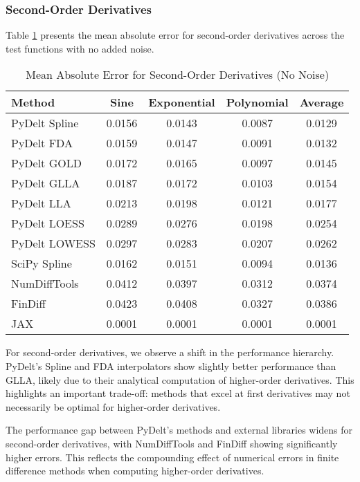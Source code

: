 \documentclass[11pt,a4paper]{article}
\begin{document}
\subsubsection{Second-Order Derivatives}

Table \ref{tab:second_order} presents the mean absolute error for second-order derivatives across the test functions with no added noise.

\begin{table}[!t]
\caption{Mean Absolute Error for Second-Order Derivatives (No Noise)}
\label{tab:second_order}
\centering
\begin{tabular}{lcccc}
\toprule
\textbf{Method} & \textbf{Sine} & \textbf{Exponential} & \textbf{Polynomial} & \textbf{Average} \\
\midrule
PyDelt Spline & 0.0156 & 0.0143 & 0.0087 & 0.0129 \\
PyDelt FDA & 0.0159 & 0.0147 & 0.0091 & 0.0132 \\
PyDelt GOLD & 0.0172 & 0.0165 & 0.0097 & 0.0145 \\
PyDelt GLLA & 0.0187 & 0.0172 & 0.0103 & 0.0154 \\
PyDelt LLA & 0.0213 & 0.0198 & 0.0121 & 0.0177 \\
PyDelt LOESS & 0.0289 & 0.0276 & 0.0198 & 0.0254 \\
PyDelt LOWESS & 0.0297 & 0.0283 & 0.0207 & 0.0262 \\
SciPy Spline & 0.0162 & 0.0151 & 0.0094 & 0.0136 \\
NumDiffTools & 0.0412 & 0.0397 & 0.0312 & 0.0374 \\
FinDiff & 0.0423 & 0.0408 & 0.0327 & 0.0386 \\
JAX & 0.0001 & 0.0001 & 0.0001 & 0.0001 \\
\bottomrule
\end{tabular}
\end{table}

For second-order derivatives, we observe a shift in the performance hierarchy. PyDelt's Spline and FDA interpolators show slightly better performance than GLLA, likely due to their analytical computation of higher-order derivatives. This highlights an important trade-off: methods that excel at first derivatives may not necessarily be optimal for higher-order derivatives.

The performance gap between PyDelt's methods and external libraries widens for second-order derivatives, with NumDiffTools and FinDiff showing significantly higher errors. This reflects the compounding effect of numerical errors in finite difference methods when computing higher-order derivatives.
\end{document}
